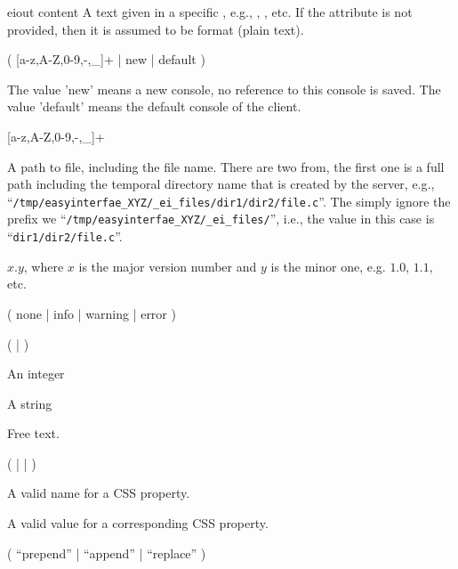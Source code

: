 \bigskip
\xmlstruct
{eiout}
{content}
{%
%
  A text given in a specific , e.g.,
  , , etc. If the
  attribute  is not provided, then it is assumed
  to be  format (plain text).
%
}

\bigskip
\noindent
{}

( [a-z,A-Z,0-9,-,\_]+ | new | default )

\medskip
\noindent
The value 'new' means a new console, no reference to this console is
saved. The value 'default' means the default console of the client.


\bigskip
\noindent
{}

 [a-z,A-Z,0-9,-,\_]+

\bigskip
\noindent
{}

\noindent
A path to file, including the file name. There are two from, the first
one is a full path including the temporal directory name that is
created by the server, e.g.,
``\texttt{/tmp/easyinterfae\_XYZ/\_ei\_files/dir1/dir2/file.c}''. The
simply ignore the prefix we
``\texttt{/tmp/easyinterfae\_XYZ/\_ei\_files/}'', i.e., the value in
this case is ``\texttt{dir1/dir2/file.c}''.

\bigskip
\noindent
{}

$x.y$, where $x$ is the major version number and $y$ is the minor one,
e.g. $1.0$, $1.1$, etc.

\bigskip
\noindent
{}

( none | info | warning | error )

\bigskip
\noindent
{}

(  |  )

\bigskip
\noindent
{}

An integer

\bigskip
\noindent
{}

A string

\bigskip
\noindent
{}

Free text.

\bigskip
\noindent
{}

(  |  | )

\bigskip
\noindent
{}

A valid name for a CSS property.

\bigskip
\noindent
{}

A valid value for a corresponding CSS property.

\bigskip
\noindent
{}

 ( ``prepend'' | ``append'' | ``replace'' )


